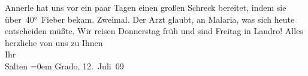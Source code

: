 \begin{ledgroupsized}[t]{13cm}
           \pstart
           Annerle hat uns vor ein paar Tagen einen
               großen Schreck bereitet, indem sie über 40° Fieber bekam. Zweimal. Der Arzt glaubt, an Malaria, was
               sich heute entscheiden müßte.\pend
           \pstart
           Wir reisen Donnerstag{ }früh und sind Freitag in Landro!\pend
           \pstart
           Alles herzliche von uns zu Ihnen {\\[\baselineskip]}Ihr {\\[\baselineskip]}\spacefill\mbox{Salten}\pend
           \leftskip=0em{}\pstart
           Grado, 12. Juli 09\pend
           
         
         \endnumbering{}\end{ledgroupsized}  \newcommand{\dateiname}{L03502}\newcommand{\titel}{Felix Salten an Arthur Schnitzler, 12. 7. 1909}\newcommand{\editorInnen}{Martin Anton Müller und Laura Untner}
      